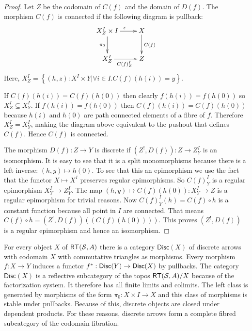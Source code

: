 \documentclass{amsart}
\theoremstyle{plain}
\theoremstyle{definition}
\newcommand\hide[1]{}
\newcommand\cat\mathcal
\newcommand\set[1]{\left\{#1\right\}}
\begin{document}
\begin{proof} Let $Z$ be the codomain of $C(f)$ and the domain of $D(f)$. The morphism $C(f)$ is connected if the following diagram is pullback:
\[\xymatrix{
X^I_Z\times I \ar[d]_{\pi_0}\ar[r]^{\epsilon} & X \ar[d]^{C(f)}\\
X^I_Z\ar[r]_{{C(f)}^I_Z} & Z
}\]
Here, $X^I_Z = \set{(h,z):X^I\times Y| \forall i\in I. C(f)(h(i)) = y }$. 

If $C(f)(h(i)) = C(f)(h(0))$ then clearly $f(h(i))=f(h(0))$ so $X^I_Z \subseteq X^I_Y$. If $f(h(i))=f(h(0))$ then $C(f)(h(i)) = C(f)(h(0))$ because $h(i)$ and $h(0)$ are path connected elements of a fibre of $f$. Therefore $X^I_Z = X^I_Y$, making the diagram above equivalent to the pushout that defines $C(f)$. Hence $C(f)$ is connected.

The morphism $D(f):Z\to Y$ is discrete if $(Z^!,D(f)):Z\to Z^I_Y$ is an isomorphism. It is easy to see that it is a split monomorphisms because there is a left inverse: $(h,y)\mapsto h(0)$. To see that this an epimorphism we use the fact that the functor $X\mapsto X^I$ preserves regular epimorphisms. \hide{gewoon uitwerken ergens.} 
So $C(f)^I_Y$ is a regular epimorphism $X^I_Y\to Z^I_Y$. The map $(h,y)\mapsto C(f)(h(0)): X^I_Y \to Z$ is a regular epimorphism for trivial reasons. Now $C(f)^I_Y(h) = C(f)\circ h$ is a constant function because all point in $I$ are connected. That means $C(f)\circ h = (Z^!,D(f))((C(f)(h(0))))$. This proves $(Z^!,D(f))$ is a regular epimorphism and hence an isomorphism.
\end{proof}

\newcommand\Disc{\mathsf{Disc}}
For every object $X$ of $\rt(\cat S,A)$ there is a category $\Disc(X)$ of discrete arrows with codomain $X$ with commutative triangles as morphisms. Every morphism $f:X\to Y$ induces a functor $f\ri:\Disc(Y)\to \Disc(X)$ by pullbacks. The category $\Disc(X)$ is a reflective subcategory of the topos $\rt(\cat S,A)/X$ because of the factorization system. It therefore has all finite limits and colimits.\hide{reflector is not lex} The left class is generated by morphisms of the form $\pi_0:X\times I \to X$ and this class of morphisms is stable under pullbacks. Because of this, discrete objects are closed under dependent products. For these reasons, discrete arrows form a complete fibred subcategory of the codomain fibration.

\newcommand\genpa{{\mathring A}}
\newcommand\gendisc{{\bf\Phi}}
\end{document}
